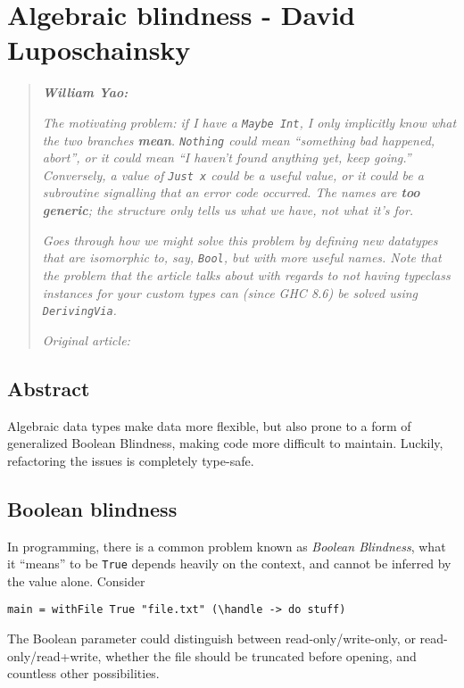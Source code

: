 \chapter{Algebraic blindness - David Luposchainsky}

\begin{quotation}
\noindent\textit{\textbf{William Yao:}}

\textit{The motivating problem: if I have a \texttt{Maybe Int}, I only implicitly know what the two branches \textbf{mean}. \texttt{Nothing} could mean ``something bad happened, abort'', or it could mean ``I haven't found anything yet, keep going.'' Conversely, a value of \texttt{Just x} could be a useful value, or it could be a subroutine signalling that an error code occurred. The names are \textbf{too generic}; the structure only tells us what we have, not what it's for.}

\textit{Goes through how we might solve this problem by defining new datatypes that are isomorphic to, say, \texttt{Bool}, but with more useful names. Note that the problem that the article talks about with regards to not having typeclass instances for your custom types can (since GHC 8.6) be solved using \texttt{DerivingVia}.}

\vspace{\baselineskip}

\noindent\textit{Original article: \cite{algebraic_blindness}}
\end{quotation}

\section{Abstract}

Algebraic data types make data more flexible, but also prone to a form of generalized Boolean Blindness, making code more difficult to maintain. Luckily, refactoring the issues is completely type-safe.

\section{Boolean blindness}


In programming, there is a common problem known as \textit{Boolean Blindness}, what it ``means'' to be \texttt{True} depends heavily on the context, and cannot be inferred by the value alone. Consider

\begin{verbatim}
main = withFile True "file.txt" (\handle -> do stuff)
\end{verbatim}
The Boolean parameter could distinguish between read-only\-/\-write-only, or read-only\-/\-read+write, whether the file should be truncated before opening, and countless other possibilities.

